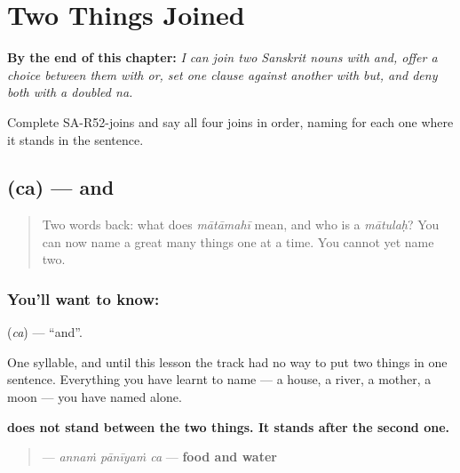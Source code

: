 
\chapter{Two Things Joined}
\label{ch:sa-two-things-joined}

\begin{chapteropening}
\textbf{By the end of this chapter:} \emph{I can join two Sanskrit nouns with and, offer a choice between them with or, set one clause against another with but, and deny both with a doubled na.}

Complete SA-R52-joins and say all four joins in order, naming for each one where it stands in the sentence.
\end{chapteropening}

\section[\texorpdfstring{\sk{च} (ca)}{च (ca)}]{ (ca) — and}

\label{lesson:SA-C52-ca}



\begin{quote}
Two words back: what does \emph{mātāmahī} mean, and who is a \emph{mātulaḥ}? You can now name a great many things one at a time. You cannot yet name two.
\end{quote}

\subsection*{You'll want to know: }
\textbf{} (\emph{ca}) — \textquotedblleft{}and\textquotedblright{}.

One syllable, and until this lesson the track had no way to put two things in one sentence. Everything you have learnt to name — a house, a river, a mother, a moon — you have named alone.

\textbf{ does not stand between the two things. It stands after the second one.}

\begin{quote}
\textbf{  } — \emph{annaṁ pānīyaṁ ca} — \textbf{food and water}
\end{quote}

